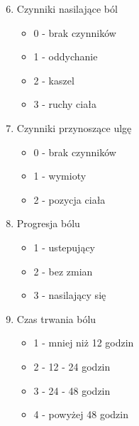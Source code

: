 \documentclass{report}
\begin{document}
\begin{itemize}
\begin{enumerate}
            \setcounter{enumi}{5}
            \item Czynniki nasilające ból
            \begin{itemize}
                \item 0 - brak czynników
                \item 1 - oddychanie
                \item 2 - kaszel
                \item 3 - ruchy ciała
            \end{itemize}
        \end{enumerate}
        \begin{enumerate}
            \setcounter{enumi}{6}
            \item Czynniki przynoszące ulgę
            \begin{itemize}
                \item 0 - brak czynników
                \item 1 - wymioty
                \item 2 - pozycja ciała
            \end{itemize}
        \end{enumerate}
        \begin{enumerate}
            \setcounter{enumi}{7}
            \item Progresja bólu
            \begin{itemize}
                \item 1 - ustepujący
                \item 2 - bez zmian
                \item 3 - nasilający się
            \end{itemize}
        \end{enumerate}
        \begin{enumerate}
            \setcounter{enumi}{8}
            \item Czas trwania bólu
            \begin{itemize}
                \item 1 - mniej niż 12 godzin
                \item 2 - 12 - 24 godzin
                \item 3 - 24 - 48 godzin
                \item 4 - powyżej 48 godzin
            \end{itemize}
        \end{enumerate}
        \begin{enumerate}

\end{enumerate}
\end{itemize}
\end{document}
